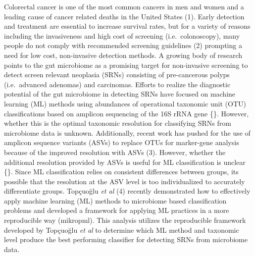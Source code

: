 \documentclass[]{article}
\begin{document}
Colorectal cancer is one of the most common cancers in men and women and
a leading cause of cancer related deaths in the United States (1). Early
detection and treatment are essential to increase survival rates, but
for a variety of reasons including the invasiveness and high cost of
screening (i.e.~colonoscopy), many people do not comply with recommended
screening guidelines (2) prompting a need for low cost, non-invasive
detection methods. A growing body of research points to the gut
microbiome as a promising target for non-invasive screening to detect
screen relevant neoplasia (SRNs) consisting of pre-cancerous polyps
(i.e.~advanced adenomas) and carcinomas. Efforts to realize the
diagnostic potential of the gut microbiome in detecting SRNs have
focused on machine learning (ML) methods using abundances of operational
taxonomic unit (OTU) classifications based on amplicon sequencing of the
16S rRNA gene \{\}. However, whether this is the optimal taxonomic
resolution for classifying SRNs from microbiome data is unknown.
Additionally, recent work has pushed for the use of amplicon sequence
variants (ASVs) to replace OTUs for marker-gene analysis because of the
improved resolution with ASVs (3). However, whether the additional
resolution provided by ASVs is useful for ML classification is unclear
\{\}. Since ML classification relies on consistent differences between
groups, its possible that the resolution at the ASV level is too
individualized to accurately differentiate groups. Topçuoğlu \emph{et
al} (4) recently demonstrated how to effectively apply machine learning
(ML) methods to microbiome based classification problems and developed a
framework for applying ML practices in a more reproducible way
(mikropml). This analysis utilizes the reproducible framework developed
by Topçuoğlu \emph{et al} to determine which ML method and taxonomic
level produce the best performing classifier for detecting SRNs from
microbiome data.
\end{document}
